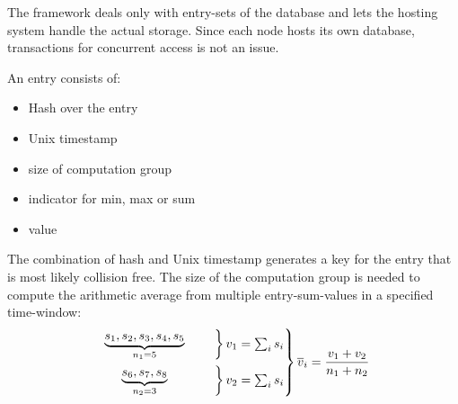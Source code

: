 The framework deals only with entry-sets of the database and lets the hosting system handle the actual storage. Since each node hosts its own database, transactions for concurrent access is not an issue.

\noindent An entry consists of:
\begin{itemize}
	\item Hash over the entry
	\item Unix timestamp
	\item size of computation group
	\item indicator for min, max or sum
	\item value
\end{itemize}

The combination of hash and Unix timestamp generates a key for the entry that is most likely collision free. The size of the computation group is needed to compute the arithmetic average from multiple entry-sum-values in a specified time-window: 
\begin{align*}
\begin{rcases*}
\begin{rcases*}
\mathmakebox[2.5cm][c]{ \underbrace{s_1, s_2, s_3, s_4, s_5}_{n_1=5} }  & \quad
\end{rcases*} v_1=\sum_{i}s_i \\
\begin{rcases*}
\mathmakebox[2.5cm][c]{ \underbrace{s_6, s_7, s_8}_{n_2=3} } & \quad
\end{rcases*} v_2=\sum_{i}s_i
\end{rcases*} \overline{v}_i=\frac{v_1+v_2}{n_1+n_2}
\end{align*}

